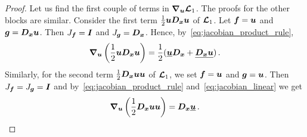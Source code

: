 \begin{proof}
  Let us find the first couple of terms in $\bm{\nabla}_{\bm{u}} \bm{\mathcal{L}}_1$. The proofs for the other blocks are similar. Consider the first term $\frac{1}{2}\bm{u} \bm{D_x} \bm{u}$ of $\bm{\mathcal{L}}_1$. Let $\bm{f} = \bm{u}$ and $\bm{g} = \bm{D_x} \bm{u}$. Then $J_{\bm{f}} = \bm{I}$ and $J_{\bm{g}} = \bm{D_x}$. Hence, by~\eqref{eq:jacobian_product_rule},
  \begin{equation*}
    \bm{\nabla}_{\bm{u}} \left( \frac{1}{2}\bm{u} \bm{D_x} \bm{u} \right) = \frac{1}{2} (\underline{\bm{u}}\bm{D_x} + \underline{\bm{D_x} \bm{u}}) \,.
  \end{equation*}
  Similarly, for the second term $\frac{1}{2} \bm{D_x} \bm{u} \bm{u}$ of $\bm{\mathcal{L}}_1$, we set $\bm{f} = \bm{u}$ and $\bm{g} = \bm{u}$. Then $J_{\bm{f}} = J_{\bm{g}} = \bm{I}$ and by~\eqref{eq:jacobian_product_rule} and~\eqref{eq:jacobian_linear} we get
  \begin{equation*}
    \bm{\nabla}_{\bm{u}} \left( \frac{1}{2} \bm{D_x} \bm{u} \bm{u} \right) = \bm{D_x} \underline{\bm{u}} \,.
  \end{equation*}

\end{proof}
